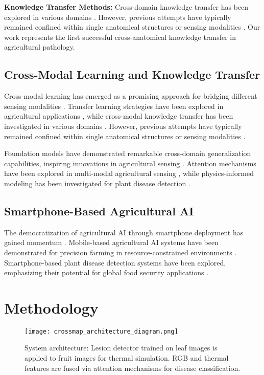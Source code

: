 \documentclass[conference]{IEEEtran}
\begin{document}
\textbf{Knowledge Transfer Methods:} Cross-domain knowledge transfer has been explored in various domains \cite{lee2021}. However, previous attempts have typically remained confined within single anatomical structures or sensing modalities \cite{chen2021}. Our work represents the first successful cross-anatomical knowledge transfer in agricultural pathology.

\subsection{Cross-Modal Learning and Knowledge Transfer}

Cross-modal learning has emerged as a promising approach for bridging different sensing modalities \cite{lee2021}. Transfer learning strategies have been explored in agricultural applications \cite{wang2020}, while cross-modal knowledge transfer has been investigated in various domains \cite{liu2019}. However, previous attempts have typically remained confined within single anatomical structures or sensing modalities \cite{chen2021}.

Foundation models have demonstrated remarkable cross-domain generalization capabilities, inspiring innovations in agricultural sensing \cite{vaswani2017}. Attention mechanisms have been explored in multi-modal agricultural sensing \cite{zhang2021}, while physics-informed modeling has been investigated for plant disease detection \cite{kumar2020}.

\subsection{Smartphone-Based Agricultural AI}

The democratization of agricultural AI through smartphone deployment has gained momentum \cite{park2020}. Mobile-based agricultural AI systems have been demonstrated for precision farming in resource-constrained environments \cite{kim2021}. Smartphone-based plant disease detection systems have been explored, emphasizing their potential for global food security applications \cite{lee2020}.

\section{Methodology}

\begin{figure}[!t]
\raggedright
\texttt{[image: crossmap\_architecture\_diagram.png]}
\caption{System architecture: Lesion detector trained on leaf images is applied to fruit images for thermal simulation. RGB and thermal features are fused via attention mechanisms for disease classification.}
\label{fig:architecture_final}
\end{figure}
\end{document}
